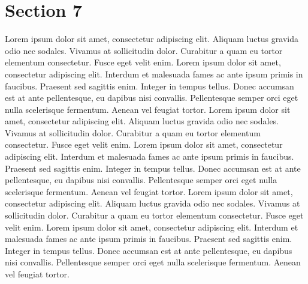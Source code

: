 \section{Section 7}
Lorem ipsum dolor sit amet, consectetur adipiscing elit. Aliquam luctus gravida odio nec sodales. Vivamus at sollicitudin dolor. Curabitur a quam eu tortor elementum consectetur. Fusce eget velit enim. Lorem ipsum dolor sit amet, consectetur adipiscing elit. Interdum et malesuada fames ac ante ipsum primis in faucibus. Praesent sed sagittis enim. Integer in tempus tellus. Donec accumsan est at ante pellentesque, eu dapibus nisi convallis. Pellentesque semper orci eget nulla scelerisque fermentum. Aenean vel feugiat tortor.
Lorem ipsum dolor sit amet, consectetur adipiscing elit. Aliquam luctus gravida odio nec sodales. Vivamus at sollicitudin dolor. Curabitur a quam eu tortor elementum consectetur. Fusce eget velit enim. Lorem ipsum dolor sit amet, consectetur adipiscing elit. Interdum et malesuada fames ac ante ipsum primis in faucibus. Praesent sed sagittis enim. Integer in tempus tellus. Donec accumsan est at ante pellentesque, eu dapibus nisi convallis. Pellentesque semper orci eget nulla scelerisque fermentum. Aenean vel feugiat tortor.
Lorem ipsum dolor sit amet, consectetur adipiscing elit. Aliquam luctus gravida odio nec sodales. Vivamus at sollicitudin dolor. Curabitur a quam eu tortor elementum consectetur. Fusce eget velit enim. Lorem ipsum dolor sit amet, consectetur adipiscing elit. Interdum et malesuada fames ac ante ipsum primis in faucibus. Praesent sed sagittis enim. Integer in tempus tellus. Donec accumsan est at ante pellentesque, eu dapibus nisi convallis. Pellentesque semper orci eget nulla scelerisque fermentum. Aenean vel feugiat tortor.

\thispagestyle{fancy}